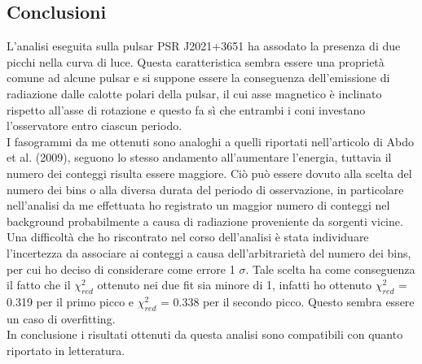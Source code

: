 \documentclass[a4paper,twocolumn]{article}
\begin{document}
\begin{large}
\section{Conclusioni}
L'analisi eseguita sulla pulsar PSR J2021+3651 ha assodato la presenza di due picchi nella curva di luce. Questa caratteristica sembra essere una proprietà comune ad alcune pulsar e si suppone essere la conseguenza dell'emissione di radiazione dalle calotte polari della pulsar, il cui asse magnetico è inclinato rispetto all'asse di rotazione e questo fa sì che entrambi i coni investano l'osservatore entro ciascun periodo.\\
I fasogrammi da me ottenuti sono analoghi a quelli riportati nell'articolo di Abdo et al. (2009), seguono lo stesso andamento all'aumentare l'energia, tuttavia il numero dei conteggi risulta essere maggiore. Ciò può essere dovuto alla scelta del numero dei bins o alla diversa durata del periodo di osservazione, in particolare nell'analisi da me effettuata ho registrato un maggior numero di conteggi nel background probabilmente a causa di radiazione proveniente da sorgenti vicine.\\
Una difficoltà che ho riscontrato nel corso dell'analisi è stata individuare l'incertezza da associare ai conteggi a causa dell'arbitrarietà del numero dei bins, per cui ho deciso di considerare come errore 1 $\sigma$. Tale scelta ha come conseguenza il fatto che il $\chi^2_{red}$ ottenuto nei due fit sia minore di 1, infatti ho ottenuto $\chi^2_{red}$ = 0.319 per il primo picco e $\chi^2_{red}$ = 0.338 per il secondo picco. Questo sembra essere un caso di overfitting.\\
In conclusione i risultati ottenuti da questa analisi sono compatibili con quanto riportato in letteratura.

\end{large}
\end{document}
